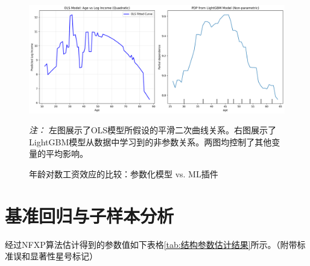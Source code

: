 \documentclass[
  a4paper,
  zihao=-4,
  fontset=mac,
  AutoFakeBold,
  AutoFakeSlant,
  oneside]{ctexbook}
\begin{document}
\begin{figure}[!ht]
\centering
\includegraphics[width=\textwidth]{../results/ml_comparison/age_partial_dependence_plot.png}
\caption{年龄对数工资效应的比较：参数化模型 vs. ML插件}
\label{fig:pdp_comparison}
\vspace{1em}
\begin{minipage}{\linewidth}
\small
\textit{注：} 左图展示了OLS模型所假设的平滑二次曲线关系。右图展示了LightGBM模型从数据中学习到的非参数关系。两图均控制了其他变量的平均影响。
\end{minipage}
\end{figure}




\section{基准回归与子样本分析} %



经过NFXP算法估计得到的参数值如下表格\ref{tab:结构参数估计结果}所示。（附带标准误和显著性星号标记）


\end{document}
